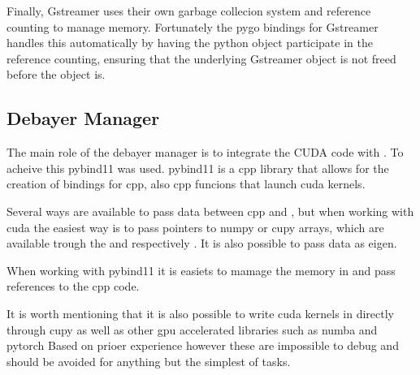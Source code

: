 Finally, Gstreamer uses their own garbage collecion system and reference counting to manage memory.
Fortunately the \gls{pygo} bindings for Gstreamer handles this automatically by having the python object participate in the reference counting, ensuring that the underlying Gstreamer object is not freed before the \py object is.


\subsection{Debayer Manager}
The main role of the debayer manager is to integrate the CUDA code with \py.
To acheive this \gls{pybind11} was used.
\gls{pybind11} is a \gls{cpp} library that allows for the creation of \py bindings for \gls{cpp}, also \gls{cpp} funcions that launch \gls{cuda} kernels.

Several ways are available to pass data between \gls{cpp} and \py, but when working with \gls{cuda} the easiest way is to pass pointers to \gls{numpy} or \gls{cupy} arrays, which are available trough the  and  respectively \cite{numpyArrayInterfaceProtocol} \cite{cupyInteroperabilityCuPy12}.
It is also possible to pass data as \gls{eigen}.

When working with \gls{pybind11} it is easiets to mamage the memory in \py and pass references to the \gls{cpp} code.

It is worth mentioning that it is also possible to write \gls{cuda} kernels in \py directly through \gls{cupy} as well as other \gls{gpu} accelerated libraries such as \gls{numba} and \gls{pytorch}
Based on prioer experience however these are impossible to debug and should be avoided for anything but the simplest of tasks.